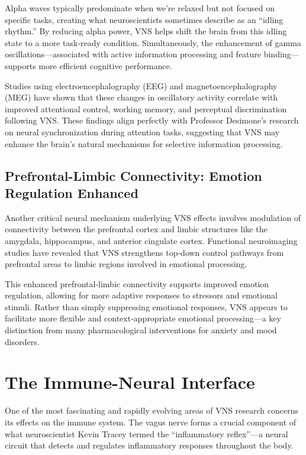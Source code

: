 \documentclass[
  Letterpaper,
]{scrbook}
\begin{document}
Alpha waves typically predominate when we're relaxed but not focused on
specific tasks, creating what neuroscientists sometimes describe as an
``idling rhythm.'' By reducing alpha power, VNS helps shift the brain
from this idling state to a more task-ready condition. Simultaneously,
the enhancement of gamma oscillations---associated with active
information processing and feature binding---supports more efficient
cognitive performance.

Studies using electroencephalography (EEG) and magnetoencephalography
(MEG) have shown that these changes in oscillatory activity correlate
with improved attentional control, working memory, and perceptual
discrimination following VNS. These findings align perfectly with
Professor Desimone's research on neural synchronization during attention
tasks, suggesting that VNS may enhance the brain's natural mechanisms
for selective information processing.

\subsection{Prefrontal-Limbic Connectivity: Emotion Regulation
Enhanced}\label{prefrontal-limbic-connectivity-emotion-regulation-enhanced}

Another critical neural mechanism underlying VNS effects involves
modulation of connectivity between the prefrontal cortex and limbic
structures like the amygdala, hippocampus, and anterior cingulate
cortex. Functional neuroimaging studies have revealed that VNS
strengthens top-down control pathways from prefrontal areas to limbic
regions involved in emotional processing.

This enhanced prefrontal-limbic connectivity supports improved emotion
regulation, allowing for more adaptive responses to stressors and
emotional stimuli. Rather than simply suppressing emotional responses,
VNS appears to facilitate more flexible and context-appropriate
emotional processing---a key distinction from many pharmacological
interventions for anxiety and mood disorders.

\section{The Immune-Neural Interface}\label{the-immune-neural-interface}

One of the most fascinating and rapidly evolving areas of VNS research
concerns its effects on the immune system. The vagus nerve forms a
crucial component of what neuroscientist Kevin Tracey termed the
``inflammatory reflex''---a neural circuit that detects and regulates
inflammatory responses throughout the body.
\end{document}
